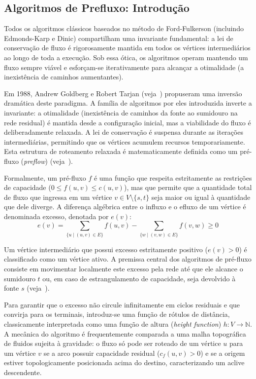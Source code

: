 \documentclass[12pt,a4paper]{article}
\begin{document}
\subsection{Algoritmos de Prefluxo: Introdução}

Todos os algoritmos clássicos baseados no método de Ford-Fulkerson (incluindo Edmonds-Karp e Dinic) compartilham uma invariante fundamental: a lei de conservação de fluxo é rigorosamente mantida em todos os vértices intermediários ao longo de toda a execução. Sob essa ótica, os algoritmos operam mantendo um fluxo sempre viável e esforçam-se iterativamente para alcançar a otimalidade (a inexistência de caminhos aumentantes).

Em 1988, Andrew Goldberg e Robert Tarjan (veja~\cite{goldberg1988new}) propuseram uma inversão dramática deste paradigma. A família de algoritmos por eles introduzida inverte a invariante: a otimalidade (inexistência de caminhos da fonte ao sumidouro na rede residual) é mantida desde a configuração inicial, mas a viabilidade do fluxo é deliberadamente relaxada. A lei de conservação é suspensa durante as iterações intermediárias, permitindo que os vértices acumulem recursos temporariamente. Esta estrutura de roteamento relaxada é matematicamente definida como um pré-fluxo (\textit{preflow}) (veja~\cite{ahuja1993network}).

Formalmente, um pré-fluxo $f$ é uma função que respeita estritamente as restrições de capacidade ($0 \le f(u,v) \le c(u,v)$), mas que permite que a quantidade total de fluxo que ingressa em um vértice $v \in V \setminus \{s, t\}$ seja maior ou igual à quantidade que dele diverge. A diferença algébrica entre o influxo e o efluxo de um vértice é denominada excesso, denotada por $e(v)$:
\begin{equation}
    e(v) = \sum_{\{u \mid (u,v) \in E\}} f(u,v) - \sum_{\{w \mid (v,w) \in E\}} f(v,w) \ge 0
\end{equation}

Um vértice intermediário que possui excesso estritamente positivo ($e(v) > 0$) é classificado como um vértice ativo. A premissa central dos algoritmos de pré-fluxo consiste em movimentar localmente este excesso pela rede até que ele alcance o sumidouro $t$ ou, em caso de estrangulamento de capacidade, seja devolvido à fonte $s$ (veja~\cite{cook1998combinatorial}).

Para garantir que o excesso não circule infinitamente em ciclos residuais e que convirja para os terminais, introduz-se uma função de rótulos de distância, classicamente interpretada como uma função de altura (\textit{height function}) $h: V \rightarrow \mathbb{N}$. A mecânica do algoritmo é frequentemente comparada a uma malha topográfica de fluidos sujeita à gravidade: o fluxo só pode ser roteado de um vértice $u$ para um vértice $v$ se a arco possuir capacidade residual ($c_f(u,v) > 0$) e se a origem estiver topologicamente posicionada acima do destino, caracterizando um aclive descendente.
\end{document}
